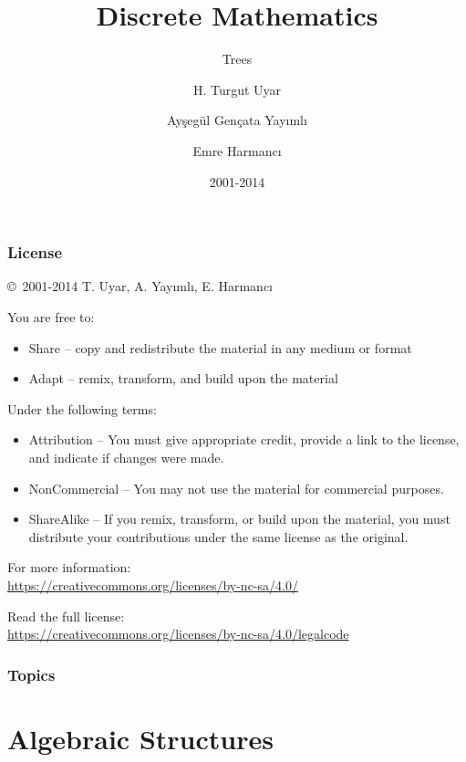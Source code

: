 \documentclass[dvipsnames]{beamer}
\title{Discrete Mathematics}
\subtitle{Trees}
\author{H. Turgut Uyar \and Ayşegül Gençata Yayımlı \and Emre Harmancı}
\date{2001-2014}
\begin{document}
\begin{frame}
  \titlepage
\end{frame}

\begin{frame}
  \frametitle{License}

  \hfill
  \copyright~2001-2014 T. Uyar, A. Yayımlı, E. Harmancı

  \vfill
  \begin{footnotesize}
    You are free to:
    \begin{itemize}
      \itemsep0em
      \item Share -- copy and redistribute the material in any medium or format
      \item Adapt -- remix, transform, and build upon the material
    \end{itemize}

    Under the following terms:
    \begin{itemize}
      \itemsep0em
      \item Attribution -- You must give appropriate credit, provide a link to
        the license, and indicate if changes were made.

      \item NonCommercial -- You may not use the material for commercial
        purposes.

      \item ShareAlike -- If you remix, transform, or build upon the material,
        you must distribute your contributions under the same license as the
        original.
    \end{itemize}
  \end{footnotesize}

  \begin{small}
    For more information:\\
    \url{https://creativecommons.org/licenses/by-nc-sa/4.0/}

    \smallskip
    Read the full license:\\
    \url{https://creativecommons.org/licenses/by-nc-sa/4.0/legalcode}
  \end{small}
\end{frame}

\begin{frame}
  \frametitle{Topics}
  \tableofcontents
\end{frame}

\section{Algebraic Structures}
\end{document}
